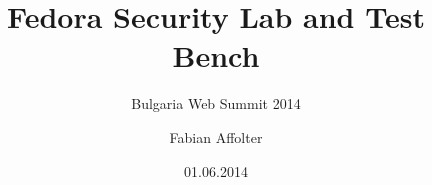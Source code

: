 \documentclass[12pt]{beamer}
\title[FSL Test Bench]{Fedora Security Lab and Test Bench}
\subtitle{Bulgaria Web Summit 2014}
\author{Fabian Affolter}
\institute[Fedora Project]
{
\medskip
{\emph{\href{mailto:fab@fedoraproject.org}{fab@fedoraproject.org}}}
}
\date{01.06.2014}
\begin{document}
%
\begin{frame}
\titlepage
\end{frame}
%
\begin{frame}
\frametitle{\\}
\tableofcontents
\end{frame}
%






%
\end{document}
